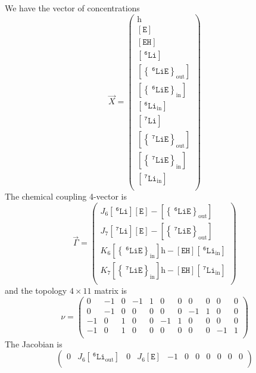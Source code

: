 \documentclass[aps,onecolumn,11pt]{revtex4}
\newcommand{\mychem}[1]{\mathtt{#1}}
\newcommand{\myconc}[1]{\left\lbrack{#1}\right\rbrack}
\newcommand{\spLi}[1]{{~^{\mychem{#1}}\mychem{Li}}}
\newcommand{\Li}[1]{\myconc{\spLi{#1}}}
\newcommand{\spEout}{\mychem{E}}
\newcommand{\Eout}{\myconc{\spEout}}
\newcommand{\spLiEin}[1]{\left\lbrace\spLi{#1}\spEout\right\rbrace_{\mathrm{in}}}
\newcommand{\LiEin}[1]{\myconc{\spLiEin{#1}}}
\newcommand{\spLiEout}[1]{\left\lbrace\spLi{#1}\spEout\right\rbrace_{\mathrm{out}}}
\newcommand{\LiEout}[1]{\myconc{\spLiEout{#1}}}
\newcommand{\spLiIn}[1]{{\spLi{#1}}_{\mathrm{in}}}
\newcommand{\LiIn}[1]{\myconc{\spLiIn{#1}}}
\newcommand{\spLiOut}[1]{{\spLi{#1}}_{\mathrm{out}}}
\newcommand{\LiOut}[1]{\myconc{\spLiOut{#1}}}
\newcommand{\spEHin}{\mychem{EH}}
\newcommand{\EHin}{\myconc{\spEHin}}
\newcommand{\proton}{\mathrm{h}}
\begin{document}
We have the vector of concentrations
\begin{equation}
	\vec{X} = 
	\begin{pmatrix}
	\proton\\
	\Eout\\
	\EHin\\
	\Li{6}\\
	\LiEout{6}\\
	\LiEin{6}\\
	\LiIn{6}\\
	\Li{7}\\
	\LiEout{7}\\
	\LiEin{7}\\
	\LiIn{7}\\
	\end{pmatrix}
\end{equation}
The chemical coupling 4-vector is
\begin{equation}
\vec{\Gamma} = 
\begin{pmatrix}
J_6 \Li{6} \Eout - \LiEout{6}\\
J_7 \Li{7} \Eout - \LiEout{7}\\
K_6 \LiEin{6}\proton - \EHin \LiIn{6}\\
K_7 \LiEin{7}\proton - \EHin \LiIn{7}\\
\end{pmatrix}
\end{equation}
and the topology  $4\times11$ matrix is
\begin{equation}
\nu = 
\left(
\begin{array}{ccccccccccc}
0 & -1 & 0 & -1 & 1 & 0 & 0 & 0 & 0 & 0 & 0\\
0 & -1 & 0 & 0 & 0 & 0 & 0 & -1 & 1 & 0 & 0\\
-1 & 0 & 1 & 0 & 0 & -1 & 1 & 0 & 0 &0 &0\\
-1 & 0 & 1 & 0 & 0 & 0 & 0 & 0 & 0 & -1 & 1\\
\end{array}
\right)
\end{equation}
The Jacobian is
\begin{equation}
\left(
\begin{array}{ccccccccccc}
0&J_6\LiOut{6}&0&J_6\Eout&-1&0&0&0&0&0&0\\
\end{array}
\right)
\end{equation}
\end{document}
